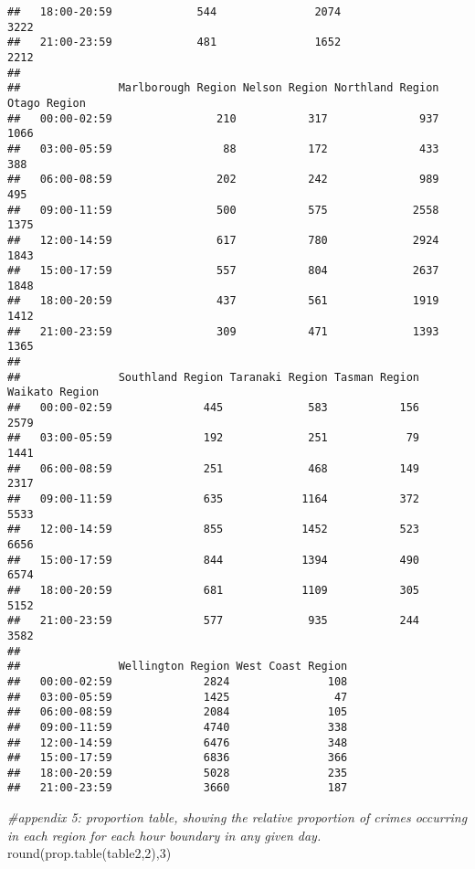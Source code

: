\documentclass[
  10pt,
]{article}
\newenvironment{Shaded}{\begin{snugshade}}{\end{snugshade}}
\newcommand{\CommentTok}[1]{\textcolor[rgb]{0.56,0.35,0.01}{\textit{#1}}}
\newcommand{\DecValTok}[1]{\textcolor[rgb]{0.00,0.00,0.81}{#1}}
\newcommand{\FunctionTok}[1]{\textcolor[rgb]{0.00,0.00,0.00}{#1}}
\newcommand{\NormalTok}[1]{#1}
\begin{document}
\begin{verbatim}
##   18:00-20:59             544               2074                     3222
##   21:00-23:59             481               1652                     2212
##              
##               Marlborough Region Nelson Region Northland Region Otago Region
##   00:00-02:59                210           317              937         1066
##   03:00-05:59                 88           172              433          388
##   06:00-08:59                202           242              989          495
##   09:00-11:59                500           575             2558         1375
##   12:00-14:59                617           780             2924         1843
##   15:00-17:59                557           804             2637         1848
##   18:00-20:59                437           561             1919         1412
##   21:00-23:59                309           471             1393         1365
##              
##               Southland Region Taranaki Region Tasman Region Waikato Region
##   00:00-02:59              445             583           156           2579
##   03:00-05:59              192             251            79           1441
##   06:00-08:59              251             468           149           2317
##   09:00-11:59              635            1164           372           5533
##   12:00-14:59              855            1452           523           6656
##   15:00-17:59              844            1394           490           6574
##   18:00-20:59              681            1109           305           5152
##   21:00-23:59              577             935           244           3582
##              
##               Wellington Region West Coast Region
##   00:00-02:59              2824               108
##   03:00-05:59              1425                47
##   06:00-08:59              2084               105
##   09:00-11:59              4740               338
##   12:00-14:59              6476               348
##   15:00-17:59              6836               366
##   18:00-20:59              5028               235
##   21:00-23:59              3660               187
\end{verbatim}

\begin{Shaded}
\begin{Highlighting}[]
\CommentTok{\#appendix 5: proportion table, showing the relative proportion of crimes occurring in each region for each hour boundary in any given day.}
\FunctionTok{round}\NormalTok{(}\FunctionTok{prop.table}\NormalTok{(table2,}\DecValTok{2}\NormalTok{),}\DecValTok{3}\NormalTok{)}
\end{Highlighting}
\end{Shaded}
\end{document}
